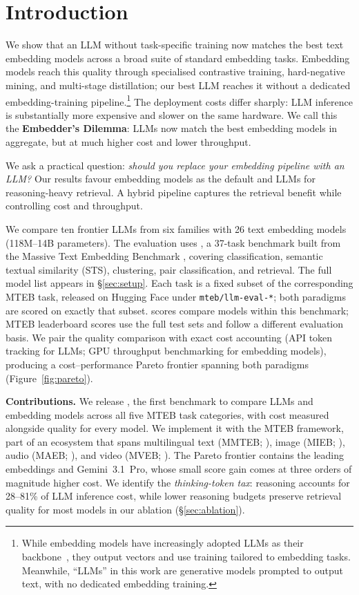 \section{Introduction}
\label{sec:intro}

We show that an LLM without task-specific training now matches the best text embedding models across a broad suite of standard embedding tasks. 
Embedding models reach this quality through specialised contrastive training, hard-negative mining, and multi-stage distillation; our best LLM reaches it without a dedicated embedding-training pipeline.\footnote{While embedding models have increasingly adopted LLMs as their backbone~\citep{tao2024llms,nie2025textembeddingmeetslarge}, they output vectors and use training tailored to embedding tasks. Meanwhile, ``LLMs'' in this work are generative models prompted to output text, with no dedicated embedding training.}
The deployment costs differ sharply: LLM inference is substantially more expensive and slower on the same hardware.
We call this the \textbf{Embedder's Dilemma}: LLMs now match the best embedding models in aggregate, but at much higher cost and lower throughput.

We ask a practical question: \emph{should you replace your embedding pipeline with an LLM?}
Our results favour embedding models as the default and LLMs for reasoning-heavy retrieval. A hybrid pipeline captures the retrieval benefit while controlling cost and throughput.

We compare ten frontier LLMs from six families with 26 text embedding models (118M--14B parameters). The evaluation uses \textbf{\mteblm}, a 37-task benchmark built from the Massive Text Embedding Benchmark \citep[MTEB;][]{muennighoff2023mteb}, covering classification, semantic textual similarity (STS), clustering, pair classification, and retrieval. The full model list appears in \S\ref{sec:setup}.
Each \mteblm{} task is a fixed subset of the corresponding MTEB task, released on Hugging Face under \texttt{mteb/llm-eval-*}; both paradigms are scored on exactly that subset.
\mteblm{} scores compare models within this benchmark; MTEB leaderboard scores use the full test sets and follow a different evaluation basis.
We pair the quality comparison with exact cost accounting (API token tracking for LLMs; GPU throughput benchmarking for embedding models), producing a cost--performance Pareto frontier spanning both paradigms (Figure~\ref{fig:pareto}).

\textbf{Contributions.}
We release \mteblm{}, the first benchmark to compare LLMs and embedding models across all five MTEB task categories, with cost measured alongside quality for every model.
We implement it with the MTEB framework, part of an ecosystem that spans multilingual text (MMTEB; \citealp{enevoldsen2025mmtebmassivemultilingualtext}), image (MIEB; \citealp{xiao2025mieb}), audio (MAEB; \citealp{elassadi2026maeb}), and video (MVEB; \citealp{elassadi2026mveb}).
The Pareto frontier contains the leading embeddings and Gemini~3.1~Pro, whose small score gain comes at three orders of magnitude higher cost.
We identify the \emph{thinking-token tax}: reasoning accounts for 28--81\% of LLM inference cost, while lower reasoning budgets preserve retrieval quality for most models in our ablation (\S\ref{sec:ablation}).

